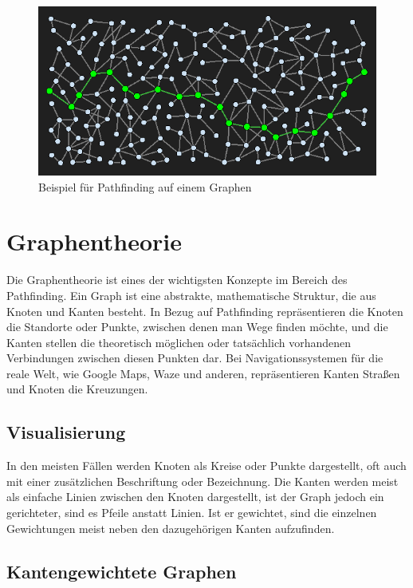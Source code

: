             \begin{figure}
                \centering
                \includegraphics[width=0.75\linewidth]{images/graph-pathfinding.png}
                \caption{Beispiel für Pathfinding auf einem Graphen\\\cite{EZ:Web05}}
                \label{fig:graph-pathfinding}
            \end{figure}
        
    \section{Graphentheorie}

        Die Graphentheorie ist eines der wichtigsten Konzepte im Bereich des Pathfinding. Ein Graph ist eine abstrakte, mathematische Struktur, die aus Knoten und Kanten besteht. In Bezug auf Pathfinding repräsentieren die Knoten die Standorte oder Punkte, zwischen denen man Wege finden möchte, und die Kanten stellen die theoretisch möglichen oder tatsächlich vorhandenen Verbindungen zwischen diesen Punkten dar. Bei Navigationssystemen für die reale Welt, wie Google Maps, Waze und anderen, repräsentieren Kanten \zb Straßen und Knoten die Kreuzungen. \cite{EZ:Web03, EZ:Web06, EZ:Web29}

        \subsection{Visualisierung}
        
            In den meisten Fällen werden Knoten als Kreise oder Punkte dargestellt, oft auch mit einer zusätzlichen Beschriftung oder Bezeichnung. Die Kanten werden meist als einfache Linien zwischen den Knoten dargestellt, ist der Graph jedoch ein gerichteter, sind es Pfeile anstatt Linien. Ist er gewichtet, sind die einzelnen Gewichtungen meist neben den dazugehörigen Kanten aufzufinden. \cite{EZ:Web07}

        \subsection{Kantengewichtete Graphen} \label{kantengewichtete-graphen}

